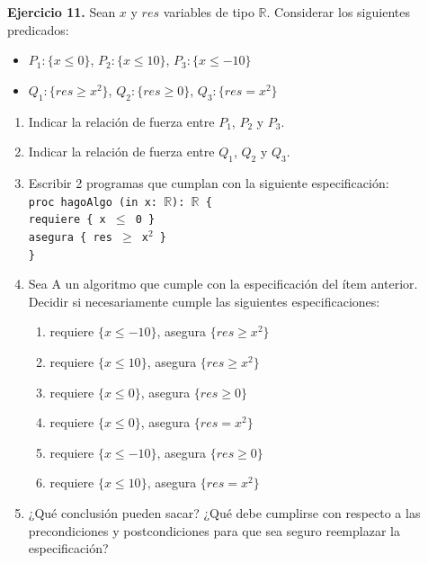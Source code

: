 \hypertarget{ej11}{}
\noindent \textbf{Ejercicio 11.} Sean $x$ y $res$ variables de tipo $\mathbb{R}$. Considerar los siguientes predicados:
\begin{itemize}
    \item $P_1: \{x \leq 0\}$, $P_2: \{x \leq 10\}$, $P_3: \{x \leq -10\}$
    \item $Q_1: \{res \geq x^2\}$, $Q_2: \{res \geq 0\}$, $Q_3: \{res = x^2\}$
\end{itemize}

\begin{enumerate}[label=\alph*)]
    \item Indicar la relación de fuerza entre $P_1$, $P_2$ y $P_3$.
    \item Indicar la relación de fuerza entre $Q_1$, $Q_2$ y $Q_3$.
    \item Escribir 2 programas que cumplan con la siguiente especificación: \\
    \texttt{proc hagoAlgo (in x: $\mathbb{R}$): $\mathbb{R}$ \{} \\
    \texttt{\hspace*{0.5cm}requiere \{ x $\leq$ 0 \}} \\
    \texttt{\hspace*{0.5cm}asegura \{ res $\geq$ x$^2$ \}} \\
    \texttt{\}}
    \item Sea A un algoritmo que cumple con la especificación del ítem anterior. Decidir si necesariamente cumple las siguientes especificaciones:
    \begin{enumerate}[label=\roman*)]
        \item requiere $\{x \leq -10\}$, asegura $\{res \geq x^2\}$
        \item requiere $\{x \leq 10\}$, asegura $\{res \geq x^2\}$
        \item requiere $\{x \leq 0\}$, asegura $\{res \geq 0\}$
        \item requiere $\{x \leq 0\}$, asegura $\{res = x^2\}$
        \item requiere $\{x \leq -10\}$, asegura $\{res \geq 0\}$
        \item requiere $\{x \leq 10\}$, asegura $\{res = x^2\}$
    \end{enumerate}
    \item ¿Qué conclusión pueden sacar? ¿Qué debe cumplirse con respecto a las precondiciones y postcondiciones para que sea seguro reemplazar la especificación?
\end{enumerate}

